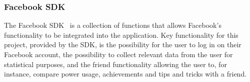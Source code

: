 \subsubsection{Facebook SDK}
The Facebook SDK~\cite{fsdk} is a collection of functions that allows Facebook’s functionality to be integrated into the application. Key functionality for this project, 
provided by the SDK, is the possibility for the user to log in on their Facebook account, the possibility to collect relevant data from the user for statistical purposes, and the 
friend functionality allowing the user to, for instance, compare power usage, achievements and tips and tricks with a friend. 

